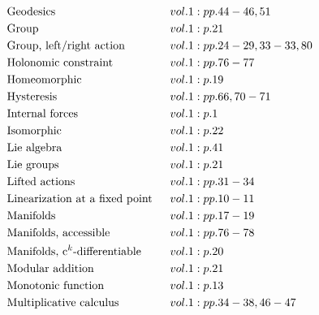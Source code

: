 \documentclass[a4paper]{article}
\begin{document}
\begin{align*}
&\text{Geodesics} \hspace{0.55556em}&& vol. 1: pp. 44-46, 51\\
&\text{Group} \hspace{0.55556em}&& vol. 1: p. 21\\
&\text{Group, left/right action} \hspace{0.55556em}&& vol. 1: pp. 24-29, 33-33, 80\\
&\text{Holonomic constraint} \hspace{0.55556em}&& vol. 1: pp. 76-77\\
&\text{Homeomorphic} \hspace{0.55556em}&& vol. 1: p. 19\\
&\text{Hysteresis} \hspace{0.55556em}&& vol. 1: pp. 66, 70-71\\
&\text{Internal forces} \hspace{0.55556em}&& vol. 1: p. 1\\
&\text{Isomorphic} \hspace{0.55556em}&& vol. 1: p. 22\\
&\text{Lie algebra} \hspace{0.55556em}&& vol. 1: p. 41\\
&\text{Lie groups} \hspace{0.55556em}&& vol. 1: p. 21\\
&\text{Lifted actions} \hspace{0.55556em}&& vol. 1: pp. 31-34\\
&\text{Linearization at a fixed point} \hspace{0.55556em}&& vol. 1: pp. 10-11\\
&\text{Manifolds} \hspace{0.55556em}&& vol. 1: pp. 17-19\\
&\text{Manifolds, accessible} \hspace{0.55556em}&& vol. 1: pp. 76-78\\
&\text{Manifolds, c$^k$-differentiable} \hspace{0.55556em}&& vol. 1: p. 20\\
&\text{Modular addition} \hspace{0.55556em}&& vol. 1: p. 21\\
&\text{Monotonic function} \hspace{0.55556em}&& vol. 1: p. 13\\
&\text{Multiplicative calculus} \hspace{0.55556em}&& vol. 1: pp. 34-38, 46-47\\

\end{align*}
\end{document}
